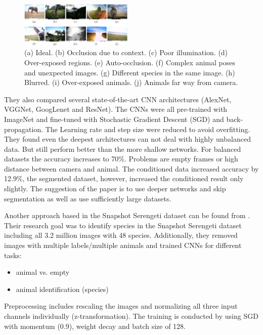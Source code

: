 \documentclass[electronic]{vgtc}             %
\begin{document}
	\begin{figure}[htbp]
		\includegraphics[width=0.48\textwidth]{quality2}
		\caption{ (a) Ideal. (b) Occlusion due
			to context. (c) Poor illumination. (d) Over-exposed regions. (e) Auto-occlusion. (f)	Complex animal poses and unexpected images. (g) Different species in the same image.	(h) Blurred. (i) Over-exposed animals. (j) Animals far way from camera.\cite{Gomez:2016}}
		\label{fig:quality2}
	\end{figure}
	
	They also compared several state-of-the-art CNN architectures (AlexNet, VGGNet, GoogLenet and ResNet).
	The CNNs were all pre-trained with ImageNet and fine-tuned with Stochastic Gradient Descent (SGD) and back-propagation. The Learning rate and step size were reduced to avoid overfitting.
	They found even the deepest architectures can not deal with highly unbalanced data. 
	But still perform better than the more shallow networks.
	For balanced datasets the accuracy increases to 70\%.
	Problems are empty frames or high distance between camera and animal.
	The conditioned data increased accuracy by 12.9\%, the segmented dataset, however, increased the conditioned result only slightly.
	The suggestion of the paper is to use deeper networks and skip segmentation as well as use sufficiently large datasets.
	
	Another approach based in the Snapshot Serengeti dataset can be found from \cite{Norouzzadeh:2017, Norouzzadeh:2017:Count}. 
	Their research goal was to identify species in the Snapshot Serengeti dataset including all 3.2 million images with 48 species. 
	Additionally, they removed images with multiple labels/multiple animals and trained CNNs for different tasks:
	\begin{itemize}
		\item animal vs. empty
		\item animal identification (species)
	\end{itemize}
	
	Preprocessing includes rescaling the images and normalizing all three input channels individually (z-transformation).
	The training is conducted by using SGD with momentum (0.9), weight decay and batch size of 128.
	
\end{document}
